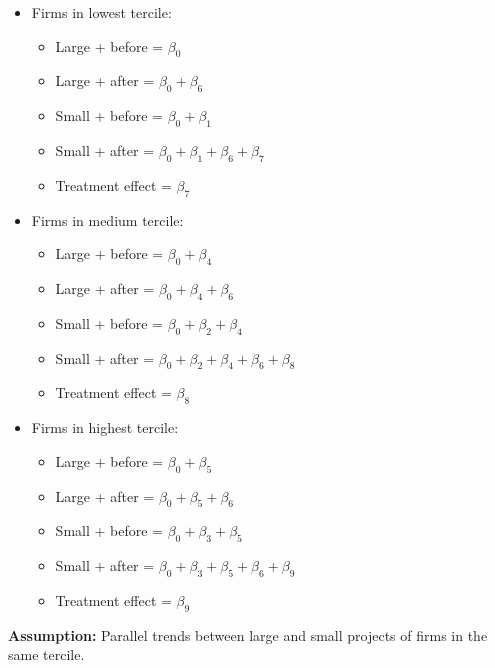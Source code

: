 \documentclass[]{article}
\providecommand{\tightlist}{%
  \setlength{\itemsep}{0pt}\setlength{\parskip}{0pt}}
\begin{document}
\begin{itemize}
\tightlist
\item
  Firms in lowest tercile:

  \begin{itemize}
  \tightlist
  \item
    Large + before = \(\beta_0\)
  \item
    Large + after = \(\beta_0 + \beta_6\)
  \item
    Small + before = \(\beta_0 + \beta_1\)
  \item
    Small + after = \(\beta_0 + \beta_1 + \beta_6 + \beta_7\)
  \item
    Treatment effect = \(\beta_7\)
  \end{itemize}
\item
  Firms in medium tercile:

  \begin{itemize}
  \tightlist
  \item
    Large + before = \(\beta_0+\beta_4\)
  \item
    Large + after = \(\beta_0+\beta_4+\beta_6\)
  \item
    Small + before = \(\beta_0+\beta_2+\beta_4\)
  \item
    Small + after = \(\beta_0+\beta_2+\beta_4 + \beta_6 + \beta_8\)
  \item
    Treatment effect = \(\beta_8\)
  \end{itemize}
\item
  Firms in highest tercile:

  \begin{itemize}
  \tightlist
  \item
    Large + before = \(\beta_0+\beta_5\)
  \item
    Large + after = \(\beta_0 + \beta_5+\beta_6\)
  \item
    Small + before = \(\beta_0+\beta_3+\beta_5\)
  \item
    Small + after = \(\beta_0 + \beta_3 + \beta_5 + \beta_6 + \beta_9\)
  \item
    Treatment effect = \(\beta_9\)
  \end{itemize}
\end{itemize}

\textbf{Assumption:} Parallel trends between large and small projects of
firms in the same tercile.
\end{document}
